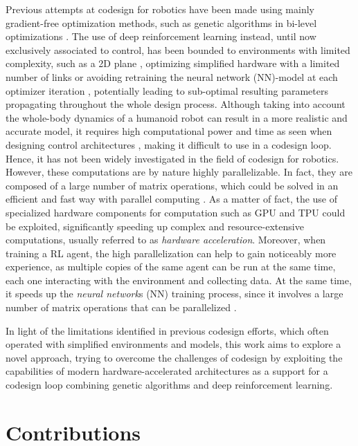 Previous attempts at codesign for robotics have been made using mainly gradient-free optimization methods, such as genetic algorithms in bi-level optimizations \citep{sartore_optimization_2022,fadini_simulation_2022}. The use of deep reinforcement learning instead, until now exclusively associated to control, has been bounded to environments with limited complexity, such as a 2D plane \citep{ha_reinforcement_2019}, optimizing simplified hardware with a limited number of links \citep{chen_hardware_2020} or avoiding retraining the neural network (\ac{NN})-model at each optimizer iteration \citep{bjelonic_learning-based_2023}, potentially leading to sub-optimal resulting parameters propagating throughout the whole design process. Although taking into account the whole-body dynamics of a humanoid robot can result in a more realistic and accurate model, it requires high computational power and time as seen when designing control architectures \citep{ramuzat_benchmarking_2022}, making it difficult to use in a codesign loop. Hence, it has not been widely investigated in the field of codesign for robotics. However, these computations are by nature highly parallelizable. In fact, they are composed of a large number of matrix operations, which could be solved in an efficient and fast way with parallel computing \citep{gyawali_comparative_2023, tuma_2023}. As a matter of fact, the use of specialized hardware components for computation such as \ac{GPU} and \ac{TPU} could be exploited, significantly speeding up complex and resource-extensive computations, usually referred to as \textit{hardware acceleration}. Moreover, when training a \ac{RL} agent, the high parallelization can help to gain noticeably more experience, as multiple copies of the same agent can be run at the same time, each one interacting with the environment and collecting data. At the same time, it speeds up the \textit{neural network}s (\ac{NN}) training process, since it involves a large number of matrix operations that can be parallelized \citep{pandey_transformational_2022,gyawali_comparative_2023}.

In light of the limitations identified in previous codesign efforts, which often operated with simplified environments and models, this work aims to explore a novel approach, trying to overcome the challenges of codesign by exploiting the capabilities of modern hardware-accelerated architectures as a support for a codesign loop combining genetic algorithms and deep reinforcement learning.

\section*{Contributions}

